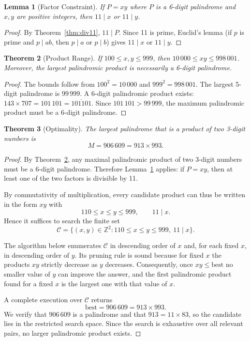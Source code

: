 \documentclass[11pt]{article}
\newtheorem{theorem}{Theorem}
\newtheorem{lemma}[theorem]{Lemma}
\begin{document}
\begin{lemma}[Factor Constraint]\label{lem:factor}
If $P = xy$ where $P$ is a 6-digit palindrome and $x, y$ are positive integers, then $11 \mid x$ or $11 \mid y$.
\end{lemma}

\begin{proof}
By Theorem~\ref{thm:div11}, $11 \mid P$. Since 11 is prime, Euclid's lemma (if $p$ is prime and $p \mid ab$, then $p \mid a$ or $p \mid b$) gives $11 \mid x$ or $11 \mid y$.
\end{proof}

\begin{theorem}[Product Range]\label{thm:range}
If $100 \le x, y \le 999$, then $10\,000 \le xy \le 998\,001$. Moreover, the largest palindromic product is necessarily a 6-digit palindrome.
\end{theorem}

\begin{proof}
The bounds follow from $100^2 = 10\,000$ and $999^2 = 998\,001$. The largest 5-digit palindrome is $99\,999$. A 6-digit palindromic product exists: $143 \times 707 = 101\,101 = \overline{101101}$. Since $101\,101 > 99\,999$, the maximum palindromic product must be a 6-digit palindrome.
\end{proof}

\begin{theorem}[Optimality]\label{thm:opt}
The largest palindrome that is a product of two 3-digit numbers is
\[
M = 906\,609 = 913 \times 993.
\]
\end{theorem}

\begin{proof}
By Theorem~\ref{thm:range}, any maximal palindromic product of two 3-digit numbers must be a 6-digit palindrome. Therefore Lemma~\ref{lem:factor} applies: if $P = xy$, then at least one of the two factors is divisible by 11.

By commutativity of multiplication, every candidate product can thus be written in the form $xy$ with
\[
110 \le x \le y \le 999,\qquad 11 \mid x.
\]
Hence it suffices to search the finite set
\[
\mathcal{C} = \{(x,y) \in \mathbb{Z}^2 : 110 \le x \le y \le 999,\ 11 \mid x\}.
\]

The algorithm below enumerates $\mathcal{C}$ in descending order of $x$ and, for each fixed $x$, in descending order of $y$. Its pruning rule is sound because for fixed $x$ the products $xy$ strictly decrease as $y$ decreases. Consequently, once $xy \le \text{best}$ no smaller value of $y$ can improve the answer, and the first palindromic product found for a fixed $x$ is the largest one with that value of $x$.

A complete execution over $\mathcal{C}$ returns
\[
\text{best} = 906\,609 = 913 \times 993.
\]
We verify that $906\,609$ is a palindrome and that $913 = 11 \times 83$, so the candidate lies in the restricted search space. Since the search is exhaustive over all relevant pairs, no larger palindromic product exists.
\end{proof}
\end{document}
